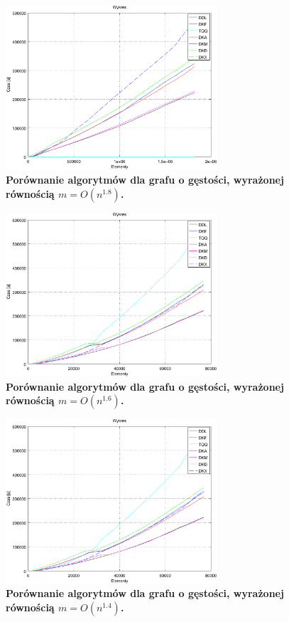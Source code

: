 \begin{figure}[!htbp]
	\centering
	\includegraphics[width=0.7\textwidth]{Chapter_IV/graph180.pdf}
	\caption{\textbf{ Porównanie algorytmów dla grafu o gęstości, wyrażonej równością $ m = O \left( n^{1.8} \right)$.}}\label{fig:plotFullGraph_1.80}
\end{figure}

\begin{figure}[!htbp]
	\centering
	\includegraphics[width=0.7\textwidth]{Chapter_IV/graph140.pdf}
	\caption{\textbf{ Porównanie algorytmów dla grafu o gęstości, wyrażonej równością $ m = O \left( n^{1.6} \right)$.}}\label{fig:plotFullGraph_1.60}
\end{figure}

\begin{figure}[!htbp]
	\centering
	\includegraphics[width=0.7\textwidth]{Chapter_IV/graph140.pdf}
	\caption{\textbf{ Porównanie algorytmów dla grafu o gęstości, wyrażonej równością $ m = O \left( n^{1.4} \right)$.}}\label{fig:plotFullGraph_1.40}
\end{figure}

